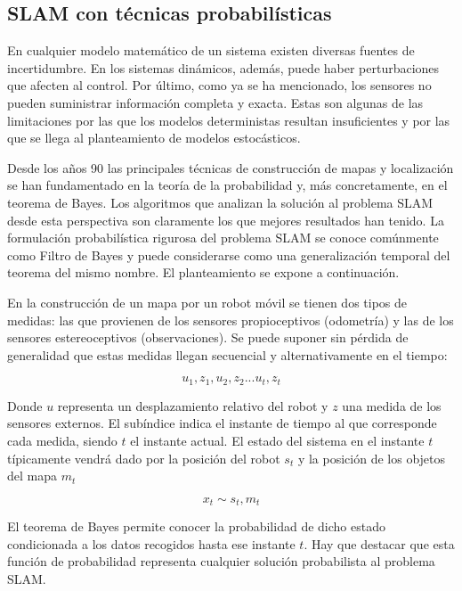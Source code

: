  \subsection{SLAM con técnicas probabilísticas}
En cualquier modelo matemático de un sistema existen diversas fuentes de incertidumbre. En los sistemas dinámicos, además, puede haber perturbaciones que afecten al control. Por último, como ya se ha mencionado, los sensores no pueden suministrar información completa y exacta. Estas son algunas de las limitaciones por las que los modelos deterministas resultan insuficientes y por las que se llega al planteamiento de modelos estocásticos.

Desde los años 90 las principales técnicas de construcción de mapas y localización se han fundamentado en la teoría de la probabilidad y, más concretamente, en el teorema de Bayes. Los algoritmos que analizan la solución al problema SLAM desde esta perspectiva son claramente los que mejores resultados han tenido.
La formulación probabilística rigurosa del problema SLAM se conoce comúnmente como Filtro de Bayes y puede considerarse como una generalización temporal del teorema del mismo nombre. El planteamiento se expone a conti\-nuación\cite{Rodriguez-Losada04}.

En la construcción de un mapa por un robot móvil se tienen dos tipos de medidas: las que provienen de los sensores propioceptivos (odometría) y las de los sensores estereoceptivos (observaciones). Se puede suponer sin pérdida de generalidad que estas medidas llegan secuencial y alternativamente en el tiempo:

\begin{equation}\label{eq:medidas}
    u_{1},z_{1},u_{2},z_{2}...u_{t},z_{t}
\end{equation}

Donde $u$ representa un desplazamiento relativo del robot y $z$ una medida de los sensores externos. El subíndice indica el instante de tiempo al que corresponde cada medida, siendo $t$ el instante actual.
El estado del sistema en el instante $t$ típicamente vendrá dado por la posición del robot $s_{t}$ y la posición de los objetos del mapa $m_{t}$

\begin{equation}\label{eq:estado}
    x_{t}\sim s_{t},m_{t}
\end{equation}

El teorema de Bayes permite conocer la probabilidad de dicho estado condicionada a los datos recogidos hasta ese instante $t$. Hay que destacar que esta función de probabilidad representa cualquier solución probabilista al problema SLAM.

